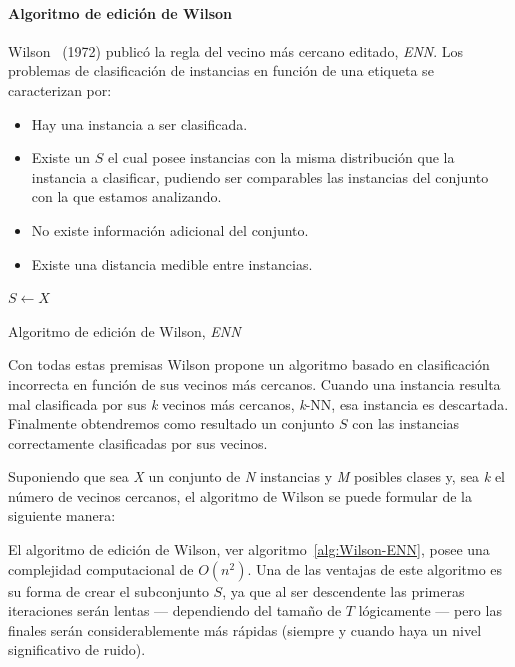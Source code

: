 \paragraph{Algoritmo de edición de Wilson}\label{paragraph:ENN}
\hfill \break
Wilson~\cite{wilson1972asymptotic} (1972) publicó la regla del vecino más cercano editado, \textit{ENN}. Los problemas de clasificación de instancias en función de una etiqueta se caracterizan por:
\begin{itemize}
\item Hay una instancia a ser clasificada.
\item Existe un $S$ el cual posee instancias con la misma distribución que la instancia a clasificar, pudiendo ser comparables las instancias del conjunto con la que estamos analizando.
\item No existe información adicional del conjunto.
\item Existe una distancia medible entre instancias.
\end{itemize}

\begin{algorithm}[H]
  	\BlankLine
  	$S \leftarrow X$\\
  \caption{Algoritmo de edición de Wilson, \textit{ENN}}\label{alg:Wilson-ENN}
\end{algorithm}

Con todas estas premisas Wilson propone un algoritmo basado en clasificación incorrecta en función de sus vecinos más cercanos. Cuando una instancia resulta mal clasificada por sus \textit{k} vecinos más cercanos, \textit{k}-NN, esa instancia es descartada. Finalmente obtendremos como resultado un conjunto $S$ con las instancias correctamente clasificadas por sus vecinos.

Suponiendo que sea \textit{X} un conjunto de \textit{N} instancias y \textit{M} posibles clases y, sea \textit{k} el número de vecinos cercanos, el algoritmo de Wilson se puede formular de la siguiente manera:

El algoritmo de edición de Wilson, ver algoritmo~\ref{alg:Wilson-ENN}, posee una complejidad computacional de $O(n^2)$. Una de las ventajas de este algoritmo es su forma de crear el subconjunto $S$, ya que al ser descendente las primeras iteraciones serán lentas --- dependiendo del tamaño de $T$ lógicamente --- pero las finales serán considerablemente más rápidas (siempre y cuando haya un nivel significativo de ruido).


